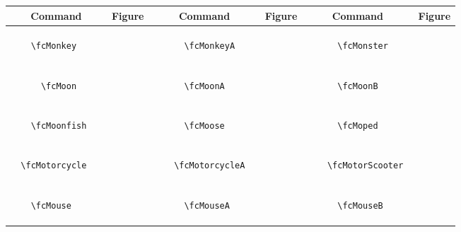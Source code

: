 \documentclass[x11names]{article}
\begin{document}
\begin{table}[H]\centering\begin{tabular}{|c|c|c|c|c|c|}\hline{\bf Command} & {\bf Figure} & {\bf Command} & {\bf Figure} & {\bf Command} & {\bf Figure}\\	\hline	&\multirow{5}{*}{	\fcMonkey	[scale=0.8]} & &\multirow{5}{*}{	\fcMonkeyA	[scale=0.4]} & &\multirow{5}{*}{	\fcMonster	[scale=0.4]}\\	& & & & & \\	& & & & & \\	\verb|	\fcMonkey	| & & \verb|	\fcMonkeyA	| & & \verb|	\fcMonster	| & \\	& & & & & \\	& & & & & \\	& & & & & \\	\hline									
		&\multirow{5}{*}{	\fcMoon	[scale=0.8]} & &\multirow{5}{*}{	\fcMoonA	[scale=0.4]} & &\multirow{5}{*}{	\fcMoonB	[scale=0.4]}\\	& & & & & \\	& & & & & \\	\verb|	\fcMoon	| & & \verb|	\fcMoonA	| & & \verb|	\fcMoonB	| & \\	& & & & & \\	& & & & & \\	& & & & & \\	\hline									
		&\multirow{5}{*}{	\fcMoonfish	[scale=0.4]} & &\multirow{5}{*}{	\fcMoose	[scale=0.4]} & &\multirow{5}{*}{	\fcMoped	[scale=0.4]}\\	& & & & & \\	& & & & & \\	\verb|	\fcMoonfish	| & & \verb|	\fcMoose	| & & \verb|	\fcMoped	| & \\	& & & & & \\	& & & & & \\	& & & & & \\	\hline									
		&\multirow{5}{*}{	\fcMotorcycle	[scale=0.4]} & &\multirow{5}{*}{	\fcMotorcycleA	[scale=0.4]} & &\multirow{5}{*}{	\fcMotorScooter	[scale=0.4]}\\	& & & & & \\	& & & & & \\	\verb|	\fcMotorcycle	| & & \verb|	\fcMotorcycleA	| & & \verb|	\fcMotorScooter	| & \\	& & & & & \\	& & & & & \\	& & & & & \\	\hline									
		&\multirow{5}{*}{	\fcMouse	[scale=0.08]} & &\multirow{5}{*}{	\fcMouseA	[scale=0.8]} & &\multirow{5}{*}{	\fcMouseB	[scale=0.4]}\\	& & & & & \\	& & & & & \\	\verb|	\fcMouse	| & & \verb|	\fcMouseA	| & & \verb|	\fcMouseB	| & \\	& & & & & \\	& & & & & \\	& & & & & \\	\hline									

\end{tabular}
\end{table}
\end{document}
